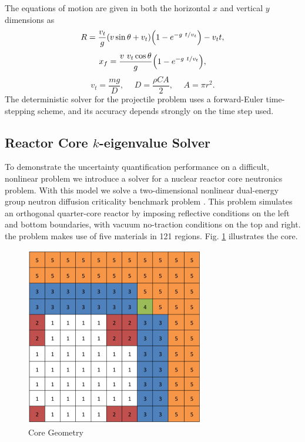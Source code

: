 \documentclass[11pt]{article}
\begin{document}
The equations of motion are given in both the horizontal $x$ and vertical $y$ dimensions as
\begin{equation}
R=\frac{v_t}{g}(v\sin\theta+v_t)\qty(1-e^{-g\ t/v_t})-v_tt,
\end{equation}
\begin{equation}
x_f = \frac{v\ v_t\cos\theta}{g}\qty(1-e^{-g\ t/v_t}),
\end{equation}
\begin{equation}
v_t = \frac{mg}{D},\hspace{15pt}D=\frac{\rho C A}{2},\hspace{15pt}A=\pi r^2.
\end{equation}
The deterministic solver for the projectile problem uses a forward-Euler time-stepping scheme, and its accuracy depends strongly on the time step used.

\subsection{Reactor Core $k$-eigenvalue Solver}
To demonstrate the uncertainty quantification performance on a difficult, nonlinear problem we introduce a solver for a nuclear reactor core neutronics problem.  With this model we solve a two-dimensional nonlinear dual-energy group neutron diffusion criticality benchmark problem \cite{benchmark}.  This problem simulates an orthogonal quarter-core reactor by imposing reflective conditions on the left and bottom boundaries, with vacuum no-traction conditions on the top and right.  the problem makes use of five materials in 121 regions.  Fig. \ref{geom} illustrates the core.  
\begin{figure}[H]
\centering
  \includegraphics[width=0.4\linewidth]{core}
  \caption{Core Geometry}
  \label{geom}
\end{figure}
\end{document}
